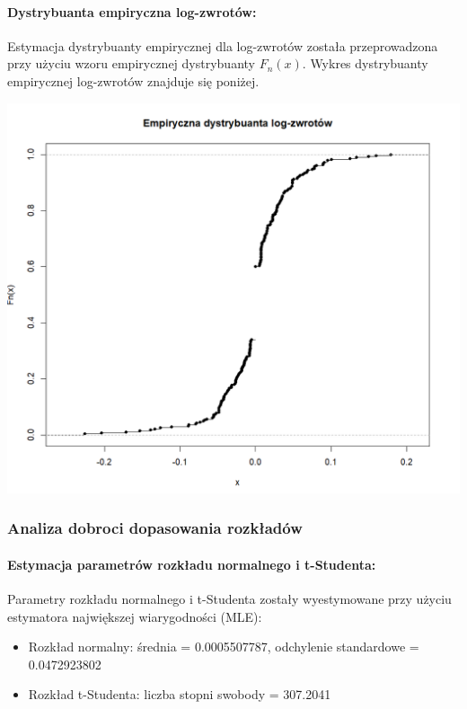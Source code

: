 \documentclass[a4paper,11pt]{article}
\begin{document}
\paragraph{Dystrybuanta empiryczna log-zwrotów:}

Estymacja dystrybuanty empirycznej dla log-zwrotów została przeprowadzona przy użyciu wzoru empirycznej dystrybuanty $F_n(x)$. Wykres dystrybuanty empirycznej log-zwrotów znajduje się poniżej.

\centerline{\includegraphics[width=14cm]{./Janek/empiryczna dystrybuanta.png}} 

\subsubsection{Analiza dobroci dopasowania rozkładów}

\paragraph{Estymacja parametrów rozkładu normalnego i t-Studenta:}

Parametry rozkładu normalnego i t-Studenta zostały wyestymowane przy użyciu estymatora największej wiarygodności (MLE):
\begin{itemize}
    \item Rozkład normalny: średnia = 0.0005507787, odchylenie standardowe = 0.0472923802
    \item Rozkład t-Studenta: liczba stopni swobody = 307.2041
\end{itemize}
\end{document}
